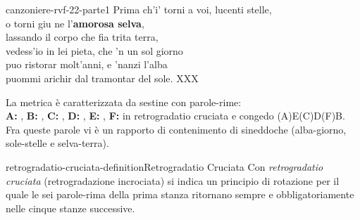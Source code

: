 \documentclass[preview]{standalone}
\begin{document}
\begin{snippet}{canzoniere-rvf-22-parte1}
{        Prima ch'i' torni a voi, lucenti stelle, \\
        o torni giu ne l'\textbf{amorosa selva}, \\
        lassando il corpo che fia trita terra, \\
        vedess'io in lei pieta, che 'n un sol giorno \\
        puo ristorar molt'anni, e 'nanzi l'alba \\
        puommi arichir dal tramontar del sole.
    }{XXX}
    
    La metrica è caratterizzata da sestine con parole-rime: \\
    \textbf{A:} , \textbf{B:} ,
    \textbf{C:} , \textbf{D:} ,
    \textbf{E:} , \textbf{F:} 
    in retrogradatio cruciata e congedo (A)E(C)D(F)B. \\
    Fra queste parole vi è un rapporto di contenimento di sineddoche (alba-giorno, sole-stelle e selva-terra).
\end{snippet}

\begin{snippetdefinition}{retrogradatio-cruciata-definition}{Retrogradatio Cruciata}
    Con \textit{retrogradatio cruciata} (retrogradazione incrociata)
    si indica un principio di rotazione per il quale le sei parole-rima
    della prima stanza ritornano sempre e obbligatoriamente nelle cinque stanze successive.
\end{snippetdefinition}
    
\end{document}
